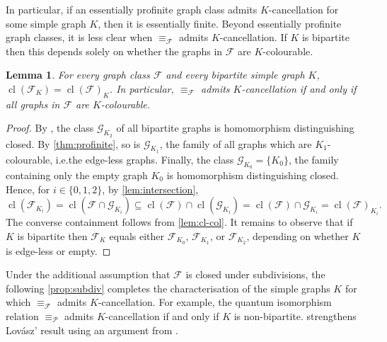 \documentclass[3p,final]{elsarticle}
\DeclareMathOperator{\cl}{cl}
\newtheorem{lemma}[theorem]{Lemma}
\begin{document}
	In particular, if an essentially profinite graph class admits $K$-cancellation for some simple graph $K$, then it is essentially finite.
	Beyond essentially profinite graph classes, it is less clear when $\equiv_{\mathcal{F}}$ admits $K$-cancellation.
	If $K$ is bipartite then this depends solely on whether the graphs in $\mathcal{F}$ are $K$-colourable.
	
	\begin{lemma} \label{cor:bipartite-exception}
		For every graph class $\mathcal{F}$ and every bipartite simple graph $K$, $\cl(\mathcal{F}_K) =  \cl(\mathcal{F})_K$.
		In particular, $\equiv_{\mathcal{F}}$ admits $K$-cancellation if and only if all graphs in $\mathcal{F}$ are $K$-colourable.
	\end{lemma}
	\begin{proof}
		By \cite[Lemma~5.8]{roberson_oddomorphisms_2022}, the class $\mathcal{G}_{K_2}$ of all bipartite graphs is homomorphism distinguishing closed.
		By \cref{thm:profinite}, so is $\mathcal{G}_{K_1}$, the family of all graphs which are $K_1$-colourable, i.e.\@ the edge-less graphs.
		Finally, the class $\mathcal{G}_{K_0} = \{K_0\}$, the family containing only the empty graph $K_0$ is homomorphism distinguishing closed.
		Hence, for $i \in \{0,1,2\}$, by \cref{lem:intersection},
		\[
		\cl(\mathcal{F}_{K_i}) = \cl(\mathcal{F} \cap \mathcal{G}_{K_i}) \subseteq \cl(\mathcal{F}) \cap \cl(\mathcal{G}_{K_i}) = \cl(\mathcal{F}) \cap \mathcal{G}_{K_i} = \cl(\mathcal{F})_{K_i}.
		\]
		The converse containment follows from \cref{lem:cl-col}.
		It remains to observe that if $K$ is bipartite then $\mathcal{F}_K$ equals either $\mathcal{F}_{K_0}$, $\mathcal{F}_{K_1}$, or $\mathcal{F}_{K_2}$, depending on whether $K$ is edge-less or empty.
	\end{proof}

	Under the additional assumption that $\mathcal{F}$ is closed under subdivisions, the following \cref{prop:subdiv} completes the characterisation of the simple graphs $K$ for which $\equiv_{\mathcal{F}}$ admits $K$-cancellation.
	For example, the quantum isomorphism relation $\equiv_{\mathcal{P}}$ \cite{mancinska_quantum_2019} admits $K$-cancellation if and only if $K$ is non-bipartite.
	 strengthens Lov\'asz' result \cite{lovasz_cancellation_1971} using an argument from \cite{dvorak_recognizing_2010}.
	
\end{document}
